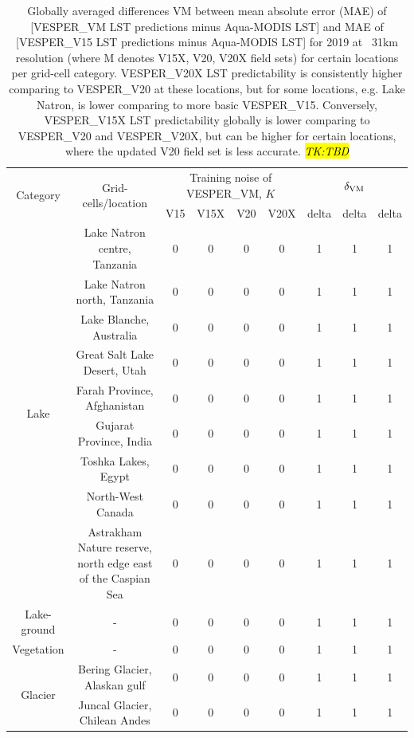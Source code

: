 \documentclass[hess, twostagejnl]{copernicus}
\begin{document}
\begin{table}
	\begin{tabular}{ccccccccc}
		\hline
		\multirow{2}{*}{Category} & \multirow{2}{*}{Grid-cells/location} & 	\multicolumn{4}{c}{Training noise of VESPER\_VM, $K$} &\multicolumn{3}{c}{$\delta_{\rm VM}$} \\  
		&&V15  & V15X & V20 & V20X &delta &delta & delta  \\
		\hline 
		\multirow{9}{*}{Lake}&Lake Natron centre, Tanzania&0 & 0 & 0 & 0 &1 &1 & 1  \\
		&Lake Natron north, Tanzania&0 & 0 & 0 & 0 &1 &1 & 1  \\
		&Lake Blanche, Australia&0 & 0 & 0 & 0 &1 &1 & 1  \\
		&Great Salt Lake Desert, Utah&0 & 0 & 0 & 0 &1 &1 & 1  \\
		&Farah Province, Afghanistan&0 & 0 & 0 & 0 &1 &1 & 1  \\
		&Gujarat Province, India&0 & 0 & 0 & 0 &1 &1 & 1  \\
		&Toshka Lakes, Egypt&0 & 0 & 0 & 0 &1 &1 & 1  \\
		&North-West Canada&0 & 0 & 0 & 0 &1 &1 & 1  \\
		&Astrakham Nature reserve, north edge east of the Caspian Sea&0 & 0 & 0 & 0 &1 &1 & 1  \\
		\hline 
		Lake-ground&-&0 & 0 & 0 & 0 &1 &1 & 1  \\
		\hline
		Vegetation&-&0 & 0 & 0 & 0 &1 &1 & 1  \\
		\hline 
		\multirow{2}{*}{Glacier}&Bering Glacier, Alaskan gulf&0 & 0 & 0 & 0 &1 &1 & 1  \\
		&Juncal Glacier, Chilean Andes &0 & 0 & 0 & 0 &1 &1 & 1  \\
		\bottomrule
	\end{tabular}
	\caption{Globally averaged differences VM between mean absolute error (MAE) of [VESPER\_VM LST predictions minus Aqua-MODIS LST] and MAE of [VESPER\_V15 LST predictions minus Aqua-MODIS LST] for 2019 at ~31km resolution (where M denotes V15X, V20, V20X field sets) for certain locations per grid-cell category. VESPER\_V20X LST predictability is consistently higher comparing to VESPER\_V20 at these locations, but for some locations, e.g. Lake Natron, is lower comparing to more basic VESPER\_V15. Conversely, VESPER\_V15X LST predictability globally is lower comparing to VESPER\_V20 and VESPER\_V20X, but can be higher for certain locations, where the updated V20 field set is less accurate. \hl{\textit{TK:TBD}}}
	\label{tab:categorisation2}
\end{table}
\end{document}
